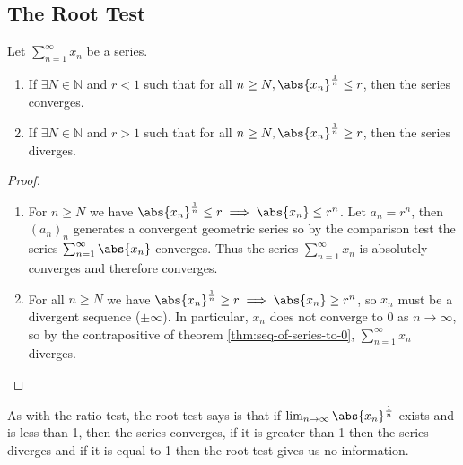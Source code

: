 \documentclass[../real_analysis.tex]{subfiles}
\begin{document}
        \subsection{The Root Test}\label{subsec:root-test}
            \begin{theorem}\label{thm:root-test}
                Let $\sum_{n=1}^\infty x_n$ be a series.
                \begin{enumerate}[label={\upshape(\roman*)}]
                    \item If $\exists N\in\mathbb{N}$ and $r<1$ such that for all $n\geq N, \abs{x_n}^\frac{1}{n}\leq r$, then the series converges.
                    \item If $\exists N\in\mathbb{N}$ and $r>1$ such that for all $n\geq N, \abs{x_n}^\frac{1}{n}\geq r$, then the series diverges.
                \end{enumerate}
            \end{theorem}
            \begin{proof}\\
                \begin{enumerate}[label={\upshape(\roman*)}]
                    \item For $n\geq N$ we have $\abs{x_n}^\frac{1}{n}\leq r\implies\abs{x_n}\leq r^n$. Let $a_n=r^n$, then $(a_n)_n$ generates a convergent geometric series so by the comparison test the series $\sum_{n=1}^\infty\abs{x_n}$ converges. Thus the series $\sum_{n=1}^\infty x_n$ is absolutely converges and therefore converges.
                    \item For all $n\geq N$ we have $\abs{x_n}^\frac{1}{n}\geq r\implies\abs{x_n}\geq r^n$, so $x_n$ must be a divergent sequence ($\pm\infty$). In particular, $x_n$ does not converge to 0 as $n\to\infty$, so by the contrapositive of theorem \ref{thm:seq-of-series-to-0}, $\sum_{n=1}^\infty x_n$ diverges.
                \end{enumerate}
            \end{proof}
            As with the ratio test, the root test says is that if $\lim_{n\to\infty}\abs{x_n}^\frac{1}{n}$ exists and is less than 1, then the series converges, if it is greater than 1 then the series diverges and if it is equal to 1 then the root test gives us no information.
            
\end{document}
